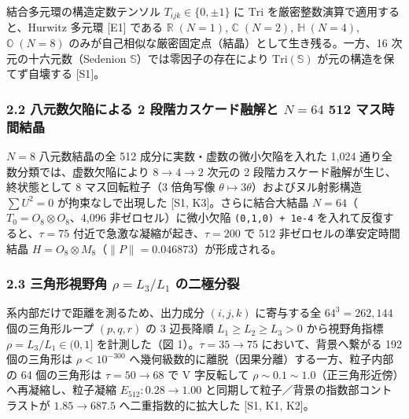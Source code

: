 \documentclass[
  a4paper,
]{ltjsarticle}
\begin{document}
結合多元環の構造定数テンソル \(T_{ijk} \in \{0, \pm 1\}\) に
\(\mathrm{Tri}\) を厳密整数演算で適用すると、Hurwitz 多元環 {[}E1{]}
である \(\mathbb{R}\;(N=1)\), \(\mathbb{C}\;(N=2)\),
\(\mathbb{H}\;(N=4)\), \(\mathbb{O}\;(N=8)\)
のみが自己相似な厳密固定点（結晶）として生き残る。一方、16
次元の十六元数（Sedenion \(\mathbb{S}\)）では零因子の存在により
\(\mathrm{Tri}(\mathbb{S})\) が元の構造を保てず自壊する {[}S1{]}。

\subsubsection{\texorpdfstring{2.2 八元数欠陥による 2
段階カスケード融解と \(N=64\) 512
マス時間結晶}{2.2 八元数欠陥による 2 段階カスケード融解と N=64 512 マス時間結晶}}\label{ux516bux5143ux6570ux6b20ux9665ux306bux3088ux308b-2-ux6bb5ux968eux30abux30b9ux30b1ux30fcux30c9ux878dux89e3ux3068-n64-512-ux30deux30b9ux6642ux9593ux7d50ux6676}

\(N = 8\) 八元数結晶の全 512 成分に実数・虚数の微小欠陥を入れた 1,024
通り全数分類では、虚数欠陥により \(8 \to 4 \to 2\) 次元の 2
段階カスケード融解が生じ、終状態として 8 マス回転粒子（3 倍角写像
\(\theta \mapsto 3\theta\)）およびヌル射影構造 \(\sum U^2 = 0\)
が拘束なしで出現した {[}S1, K3{]}。さらに結合大結晶
\(N = 64\)（\(T_0 = O_8 \otimes O_8\)、4,096 非ゼロセル）に微小欠陥
\texttt{(0,1,0)\ +\ 1e-4} を入れて反復すると、\(\tau = 75\)
付近で急激な凝縮が起き、\(\tau = 200\) で 512 非ゼロセルの準安定時間結晶
\(H = O_8 \otimes M_8\)（\(\|P\| = 0.046873\)）が形成される。

\subsubsection{\texorpdfstring{2.3 三角形視野角 \(\rho = L_3 / L_1\)
の二極分裂}{2.3 三角形視野角 \textbackslash rho = L\_3 / L\_1 の二極分裂}}\label{ux4e09ux89d2ux5f62ux8996ux91ceux89d2-rho-l_3-l_1-ux306eux4e8cux6975ux5206ux88c2}

系内部だけで距離を測るため、出力成分 \((i,j,k)\) に寄与する全
\(64^3 = 262{,}144\) 個の三角形ループ \((p,q,r)\) の 3 辺長降順
\(L_1 \ge L_2 \ge L_3 > 0\) から視野角指標
\(\rho = L_3 / L_1 \in (0, 1]\) を計測した（図 1）。\(\tau = 35 \to 75\)
において、背景へ繋がる 192 個の三角形は \(\rho < 10^{-300}\)
へ幾何級数的に離脱（因果分離）する一方、粒子内部の 64 個の三角形は
\(\tau = 50 \to 68\) で V 字反転して
\(\rho \sim 0.1 \sim 1.0\)（正三角形近傍）へ再凝縮し、粒子凝縮
\(E_{512}: 0.28 \to 1.00\) と同期して粒子／背景の指数部コントラストが
\(1.85 \to 687.5\) へ二重指数的に拡大した {[}S1, K1, K2{]}。
\end{document}
